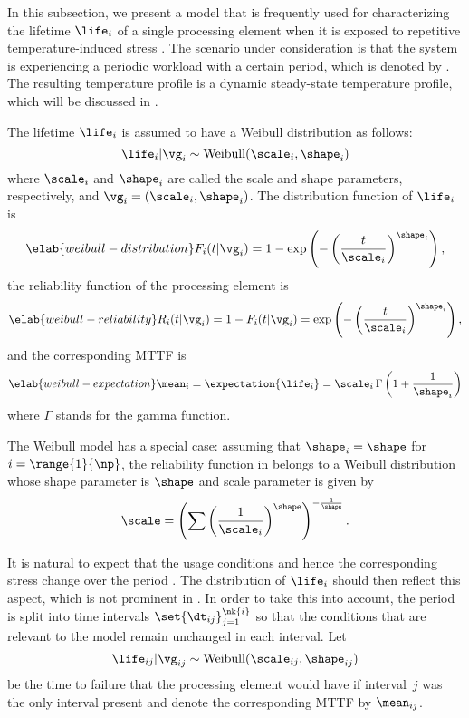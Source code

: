 In this subsection, we present a model that is frequently used for
characterizing the lifetime $\life_i$ of a single processing element when it is
exposed to repetitive temperature-induced stress \cite{huang2009b, xiang2010}.
The scenario under consideration is that the system is experiencing a periodic
workload with a certain period, which is denoted by \period. The resulting
temperature profile is a dynamic steady-state temperature profile, which will be
discussed in .

The lifetime $\life_i$ is assumed to have a Weibull distribution as follows:
\[
  \life_i | \vg_i \sim \mathrm{Weibull}(\scale_i, \shape_i)
\]
where $\scale_i$ and $\shape_i$ are called the scale and shape parameters,
respectively, and $\vg_i = (\scale_i, \shape_i)$. The distribution function of
$\life_i$ is
\begin{equation} \elab{weibull-distribution}
  F_i(t | \vg_i) = 1 - \exp\left(-\left(\frac{t}{\scale_i}\right)^{\shape_i}\right),
\end{equation}
the reliability function of the processing element is
\begin{equation} \elab{weibull-reliability}
  R_i(t | \vg_i) = 1 - F_i(t | \vg_i) = \exp\left(-\left(\frac{t}{\scale_i}\right)^{\shape_i}\right),
\end{equation}
and the corresponding \ac{MTTF} is
\begin{equation} \elab{weibull-expectation}
  \mean_i = \expectation{\life_i} = \scale_i \, \Gamma\left(1 + \frac{1}{\shape_i}\right)
\end{equation}
where $\Gamma$ stands for the gamma function.

\begin{remark} 
The Weibull model has a special case: assuming that $\shape_i = \shape$ for $i =
\range{1}{\np}$, the reliability function in  belongs to
a Weibull distribution whose shape parameter is $\shape$ and scale parameter is
given by
\[
  \scale = \left(\sum\left(\frac{1}{\scale_i}\right)^\shape\right)^{-\frac{1}{\shape}}.
\]
\end{remark}

It is natural to expect that the usage conditions and hence the corresponding
stress change over the period \period. The distribution of $\life_i$ should then
reflect this aspect, which is not prominent in . In
order to take this into account, the period is split into  time intervals
$\set{\dt_{ij}}_{j = 1}^{\nk{i}}$ so that the conditions that are relevant to
the model remain unchanged in each interval. Let
\[
  \life_{ij} | \vg_{ij} \sim \mathrm{Weibull}(\scale_{ij}, \shape_{ij})
\]
be the time to failure that the processing element would have if interval~$j$
was the only interval present and denote the corresponding \ac{MTTF} by
$\mean_{ij}$.

